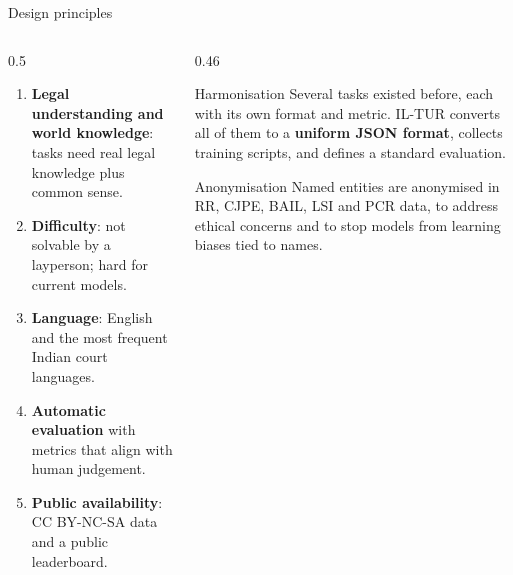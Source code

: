 \documentclass[aspectratio=169,11pt]{beamer}
\begin{document}
\begin{frame}{Design principles}
  \begin{columns}[T]
    \begin{column}{0.5\textwidth}
      \small
      \begin{enumerate}
        \item \textbf{Legal understanding and world knowledge}: tasks need real legal knowledge plus common sense.
        \item \textbf{Difficulty}: not solvable by a layperson; hard for current models.
        \item \textbf{Language}: English and the most frequent Indian court languages.
        \item \textbf{Automatic evaluation} with metrics that align with human judgement.
        \item \textbf{Public availability}: CC BY-NC-SA data and a public leaderboard.
      \end{enumerate}
    \end{column}
    \begin{column}{0.46\textwidth}
      \begin{block}{Harmonisation}
        \small
        Several tasks existed before, each with its own format and metric. IL-TUR converts all of them to a \textbf{uniform JSON format}, collects training scripts, and defines a standard evaluation.
      \end{block}
      \begin{exampleblock}{Anonymisation}
        \small
        Named entities are anonymised in RR, CJPE, BAIL, LSI and PCR data, to address ethical concerns and to stop models from learning biases tied to names.
      \end{exampleblock}
    \end{column}
  \end{columns}
\end{frame}
\end{document}
